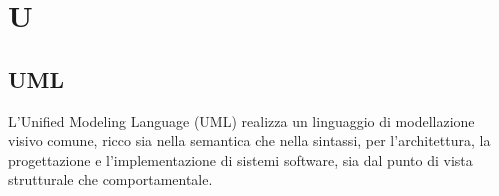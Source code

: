 \section{U}

\subsection{UML}
L'Unified Modeling Language (UML) realizza un linguaggio di modellazione visivo comune, ricco sia nella semantica che nella sintassi, per l'architettura, la progettazione e l'implementazione di sistemi software,  sia dal punto di vista strutturale che comportamentale.

\clearpage
